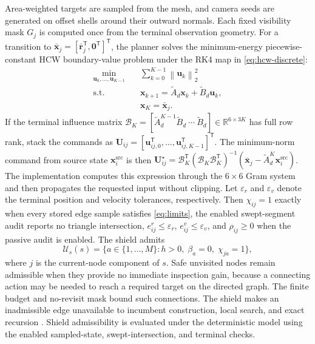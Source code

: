\documentclass{IEEEtaes}
\newcommand{\norm}[1]{\left\lVert #1 \right\rVert}
\begin{document}
Area-weighted targets are sampled from the mesh, and camera seeds are generated on offset shells around their outward normals. Each fixed visibility mask $G_j$ is computed once from the terminal observation geometry. For a transition to $\bar{\mathbf x}_j=[\bar{\mathbf r}_j^{\mathsf T},\mathbf0^{\mathsf T}]^{\mathsf T}$, the planner solves the minimum-energy piecewise-constant HCW boundary-value problem under the RK4 map in \eqref{eq:hcw-discrete}:
\begin{equation}
  \begin{aligned}
  \min_{\mathbf u_0,\ldots,\mathbf u_{K-1}}\quad&
  \sum_{k=0}^{K-1}\norm{\mathbf u_k}_2^2\\
  \mathrm{s.t.}\quad&
  \mathbf x_{k+1}=\widetilde A_d\mathbf x_k+\widetilde B_d\mathbf u_k,\\
  &\mathbf x_K=\bar{\mathbf x}_j.
  \end{aligned}
  \label{eq:terminal-transfer}
\end{equation}
If the terminal influence matrix $\mathcal B_K=[\widetilde A_d^{K-1}\widetilde B_d\ \cdots\ \widetilde B_d]\in\mathbb R^{6\times3K}$ has full row rank, stack the commands as $\mathbf U_{ij}=[\mathbf u_{ij,0}^{\mathsf T},\ldots,\mathbf u_{ij,K-1}^{\mathsf T}]^{\mathsf T}$. The minimum-norm command from source state $\mathbf x_i^{\mathrm{src}}$ is then $\mathbf U_{ij}^\star=\mathcal B_K^{\mathsf T}(\mathcal B_K\mathcal B_K^{\mathsf T})^{-1}(\bar{\mathbf x}_j-\widetilde A_d^K\mathbf x_i^{\mathrm{src}})$. The implementation computes this expression through the $6\times6$ Gram system and then propagates the requested input without clipping. Let $\varepsilon_r$ and $\varepsilon_v$ denote the terminal position and velocity tolerances, respectively. Then $\chi_{ij}=1$ exactly when every stored edge sample satisfies \eqref{eq:limits}, the enabled swept-segment audit reports no triangle intersection, $e_{ij}^{r}\le\varepsilon_r$, $e_{ij}^{v}\le\varepsilon_v$, and $\rho_{ij}\ge0$ when the passive audit is enabled. The shield admits
\begin{equation}
  \mathcal U_s(s)=\{a\in\{1,\ldots,M\}:h>0,\;\beta_a=0,\;\chi_{ja}=1\},
  \label{eq:safe-action-set}
\end{equation}
where $j$ is the current-node component of $s$. Safe unvisited nodes remain admissible when they provide no immediate inspection gain, because a connecting action may be needed to reach a required target on the directed graph. The finite budget and no-revisit mask bound such connections. The shield makes an inadmissible edge unavailable to incumbent construction, local search, and exact recursion \cite{alshiekh2018shielding}. Shield admissibility is evaluated under the deterministic model using the enabled sampled-state, swept-intersection, and terminal checks.
\end{document}
